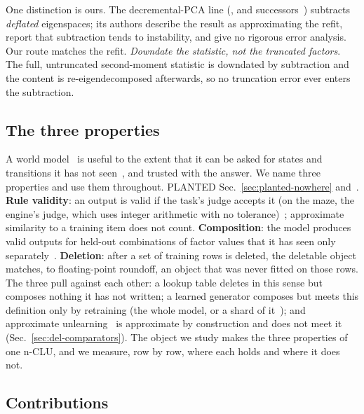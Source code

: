 \documentclass{article} %
\begin{document}
One distinction is ours. The decremental-PCA line
(\citealp{hall_adding_2002}, and successors~\citep{jin_evd_2014,lee_fast_2021}) subtracts \emph{deflated} eigenspaces; its
authors describe the result as approximating the refit, report that subtraction tends to
instability, and give no rigorous error analysis. Our route matches the refit.
\emph{Downdate the statistic, not the truncated factors}. The full, untruncated second-moment
statistic is downdated by subtraction and the content is re-eigendecomposed afterwards, so no
truncation error ever enters the subtraction.

\subsection{The three properties}
\label{sec:why}

A world model~\citep{ha_world_2018,hafner_mastering_2025} is useful to the extent that it can be asked for states and transitions it
has not seen~\citep{valevski_diffusion_2025}, and trusted with the answer. We name three properties and use them throughout. PLANTED Sec.~\ref{sec:planted-nowhere} and~\citep{planted_nokey_2099}.
\textbf{Rule validity}: an output is valid if the task's judge accepts it (on the maze, the engine's judge, which uses
integer arithmetic with no tolerance)~\citep{vafa_evaluating_2024}; approximate similarity to a training item does not count.
\textbf{Composition}: the model produces valid outputs for held-out combinations of factor
values that it has seen only separately~\citep{zhao_toward_2022}. \textbf{Deletion}: after a set of training rows
is deleted, the deletable object matches, to floating-point roundoff, an object that was never fitted
on those rows. The three pull against each other: a lookup table deletes in this sense but composes
nothing it has not written; a learned generator composes but meets this definition only by retraining
(the whole model, or a shard of it~\citep{bourtoule_machine_2021}); and
approximate unlearning~\citep{guo_certified_2023,golatkar_eternal_2020} is approximate by construction and does not meet it (Sec.~\ref{sec:del-comparators}).
The object we study makes the three properties of one n-CLU, and we measure, row by row, where each
holds and where it does not.

\subsection{Contributions}
\label{sec:contrib}
\end{document}
